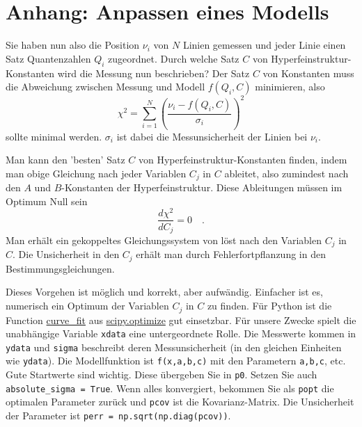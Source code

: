 


\section{Anhang: Anpassen eines Modells}

Sie haben nun also die Position $\nu_i$ von $N$ Linien gemessen und jeder Linie einen Satz Quantenzahlen $Q_i$ zugeordnet. Durch welche Satz $C$ von Hyperfeinstruktur-Konstanten wird die Messung nun beschrieben? Der Satz $C$ von Konstanten muss die Abweichung zwischen Messung und Modell $f(Q_i, C)$ minimieren, also
\begin{equation}
    \chi^2 = \sum_{i=1}^N \left(\frac{\nu_i - f(Q_i, C)}{\sigma_i}\right)^2
\end{equation}
sollte minimal werden. $\sigma_i$ ist dabei die Messunsicherheit der Linien bei $\nu_i$.

Man kann den 'besten' Satz $C$ von Hyperfeinstruktur-Konstanten finden, indem man obige Gleichung nach jeder Variablen $C_j$ in $C$ ableitet, also zumindest nach den $A$ und $B$-Konstanten der Hyperfeinstruktur. Diese Ableitungen müssen im Optimum Null sein
\begin{equation}
    \frac{d \chi^2}{d C_j} = 0 \quad .
\end{equation}
Man erhält ein gekoppeltes Gleichungssystem von löst nach den Variablen $C_j$ in $C$. Die Unsicherheit in den $C_j$ erhält man durch Fehlerfortpflanzung in den Bestimmungsgleichungen.

Dieses Vorgehen ist möglich und korrekt, aber aufwändig. Einfacher ist es, numerisch ein Optimum der Variablen $C_j$ in $C$  zu finden. Für Python ist die Function \href{https://docs.scipy.org/doc/scipy-1.14.0/reference/generated/scipy.optimize.curve_fit.html}{curve\_fit} aus \href{https://docs.scipy.org/doc/scipy-1.14.0/reference/optimize.html}{scipy.optimize} gut einsetzbar. Für unsere Zwecke spielt die unabhängige Variable \texttt{xdata} eine untergeordnete  Rolle. Die Messwerte kommen in  \texttt{ydata} und \texttt{sigma} beschreibt deren Messunsicherheit (in den gleichen Einheiten wie  \texttt{ydata}).  Die Modellfunktion ist \texttt{f(x,a,b,c)} mit den Parametern \texttt{a,b,c}, etc. Gute Startwerte sind wichtig. Diese übergeben Sie in   \texttt{p0}.  Setzen Sie auch  \texttt{absolute\_sigma = True}. Wenn alles konvergiert, bekommen Sie als \texttt{popt} die optimalen Parameter zurück und \texttt{pcov} ist die Kovarianz-Matrix. Die Unsicherheit der Parameter ist \texttt{perr = np.sqrt(np.diag(pcov))}.

